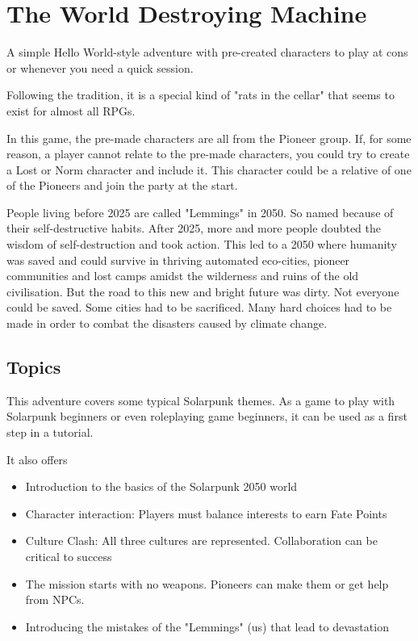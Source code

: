 \chapter{The World Destroying Machine}
\label{ch:the world destroying machine}

A simple Hello World-style adventure with pre-created characters to play at cons or whenever you need a quick session.

Following the tradition, it is a special kind of "rats in the cellar" that seems to exist for almost all RPGs.

In this game, the pre-made characters are all from the Pioneer group. If, for some reason, a player cannot relate to the pre-made characters, you could try to create a Lost or Norm character and include it. This character could be a relative of one of the Pioneers and join the party at the start.

\begin{sidebarBox}[title=Dirty Road to Eden]

People living before 2025 are called "Lemmings" in 2050. So named because of their self-destructive habits. After 2025, more and more people doubted the wisdom of self-destruction and took action. This led to a 2050 where humanity was saved and could survive in thriving automated eco-cities, pioneer communities and lost camps amidst the wilderness and ruins of the old civilisation. But the road to this new and bright future was dirty. Not everyone could be saved. Some cities had to be sacrificed. Many hard choices had to be made in order to combat the disasters caused by climate change.

\end{sidebarBox}

\section{Topics}

This adventure covers some typical Solarpunk themes. As a game to play with Solarpunk beginners or even roleplaying game beginners, it can be used as a first step in a tutorial.

It also offers

\begin{itemize}
\item Introduction to the basics of the Solarpunk 2050 world
\item Character interaction: Players must balance interests to earn Fate Points
\item Culture Clash: All three cultures are represented. Collaboration can be critical to success
\item The mission starts with no weapons. Pioneers can make them or get help from NPCs.
\item Introducing the mistakes of the "Lemmings" (us) that lead to devastation
\end{itemize}

